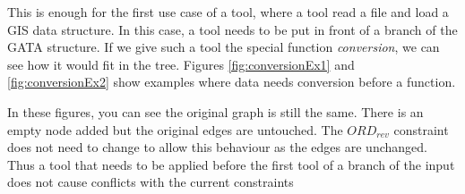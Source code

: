 \documentclass{article}
\begin{document}
This is enough for the first use case of a tool, where a tool read a file and load a GIS data structure. In this case, a tool needs to be put in front of a branch of the GATA structure. If we give such a tool the special function \textit{conversion}, we can see how it would fit in the tree. Figures  \ref{fig:conversionEx1} and \ref{fig:conversionEx2} show examples where data needs conversion before a function. 

In these figures, you can see the original graph is still the same. There is an empty node added but the original edges are untouched. The $ORD_{rev}$ constraint does not need to change to allow this behaviour as the edges are unchanged.  Thus a tool that needs to be applied before the first tool of a branch of the input does not cause conflicts with the current constraints
\\





\end{document}
